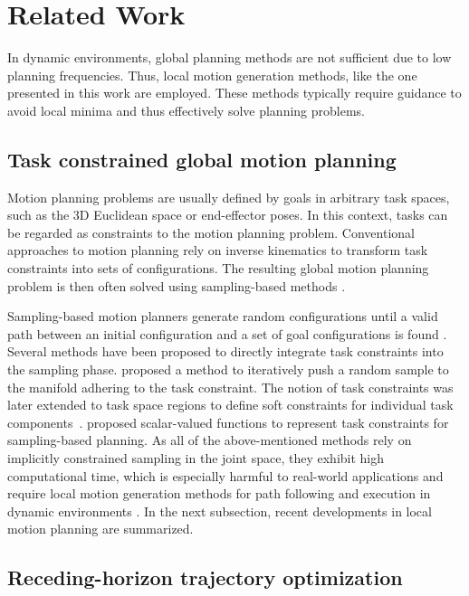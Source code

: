 \section{Related Work}%
\label{sec:state}

In dynamic environments, global planning methods are not sufficient
due to low planning frequencies. Thus, local motion generation methods, like
the one presented in this work are employed. These methods typically
require guidance to avoid local minima and thus effectively solve planning problems.

\subsection{Task constrained global motion planning}%
\label{sub:state_global}

Motion planning problems are usually defined by goals in arbitrary task spaces,
such as the 3D Euclidean space or end-effector poses. In this
context, tasks can be regarded as constraints to the motion planning problem.
Conventional approaches to motion planning rely on inverse kinematics to
transform task constraints into sets of configurations. The resulting global
motion planning problem is then often solved using sampling-based methods
\cite{Rickert2014}.

Sampling-based motion planners generate random configurations
until a valid path between an initial
configuration and a set of goal configurations is found
\cite{Karaman2011}. Several methods have been proposed to directly
integrate task constraints into the sampling phase. 
\cite{Stilman2010} proposed a
method to iteratively push a random sample to the manifold adhering to the task constraint.
The notion of
task constraints was later extended to task space regions to define soft constraints for
individual task components~\cite{Berenson2011}.
\cite{Kingston2019} proposed scalar-valued functions to represent task
constraints for sampling-based planning.
As all of the above-mentioned methods rely on implicitly constrained sampling
in the joint space, they exhibit high computational time, which is especially
harmful to real-world applications \cite{Qureshi2020}
and require local motion generation methods for path following
and execution in dynamic environments
\cite{Brito2019}.
In the next
subsection, recent developments in local motion planning are summarized.

\subsection{Receding-horizon trajectory optimization}%
\label{sub:state_local}

